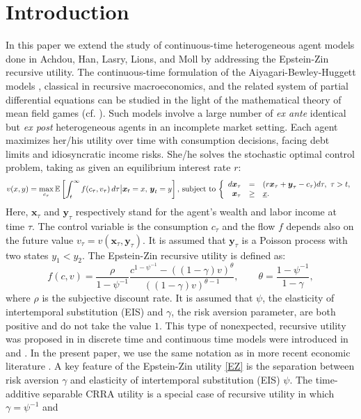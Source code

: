 \documentclass[11pt]{article}
\numberwithin{equation}{section}
\theoremstyle{definition}
\newcommand{\EE}{\mathbb{E}}
\newcommand{\g}{\gamma}
\newcommand{\p}{\psi}
\theoremstyle{plain}
\begin{document}
\section{Introduction}
	In this paper we extend the study of continuous-time heterogeneous agent models done in Achdou, Han, Lasry, Lions, and Moll \cite{achdou2022income} by addressing the {}{Epstein-Zin recursive utility}. The continuous-time formulation of the Aiyagari-Bewley-Huggett models \cite{huggett1993risk,aiyagari1994uninsured,ljungqvist2018recursive}, classical in recursive macroeconomics, and the related system of partial differential equations can be studied in the light of the mathematical theory of mean field games (cf. \cite{achdou2021mean,MR2295621}). Such models involve a large number of \textit{ex ante} identical but \textit{ex post} heterogeneous agents in an incomplete market setting. Each agent maximizes her/his utility over time with consumption decisions, facing debt limits and idiosyncratic income risks. She/he solves the stochastic optimal control problem, taking as given an equilibrium interest rate $r$:
	\begin{equation}\label{control_problem}
	v(x,y)=\max_{c_\tau}\EE \left[\int_t^{\infty} f(c_\tau,v_\tau)\, d\tau \big\vert \boldsymbol{x}_t=x,\,\boldsymbol{y}_t=y\right],\, \text{subject to}\,
      \left\{
        \begin{array}[c]{rcl}
          d\boldsymbol{x}_\tau &=& (r \boldsymbol{x}_\tau+\boldsymbol{y}_{\tau} - c_\tau)d\tau,\,\,\tau>t,\\
          \boldsymbol{x}_\tau  &\geq& \underline{x}.    
        \end{array}
      \right.  
	\end{equation}
	Here, $\boldsymbol{x}_\tau$ and $\boldsymbol{y}_{\tau}$ respectively stand for the agent's wealth and labor income at time $\tau$. The control variable is the consumption $c_\tau$ and the flow $f$ depends also on the future value $v_\tau=v(\boldsymbol{x}_\tau,\boldsymbol{y}_{\tau})$. It is assumed that $\boldsymbol{y}_{\tau}$ is a Poisson process with two states $y_1<y_2$. The Epstein-Zin recursive utility is defined as:
       \begin{equation}
         \label{EZ}
       f(c,v)=\frac{\rho}{1-\p^{-1}}\frac{c^{1-\p^{-1}}-((1-\g)v)^\theta}{((1-\g)v)^{\theta-1}},\qquad \theta=\frac{1-\p^{-1}}{1-\g},
       \end{equation}
where $\rho$ is the subjective discount rate. It is assumed that $\p$, the elasticity of intertemporal substitution (EIS) and $\g$, the risk aversion parameter, are both positive and do not take the value $1$. This type of nonexpected, recursive utility was proposed in \cite{EZ1989} in discrete time and continuous time models were introduced in \cite{duffie1992stochastic} and \cite{duffie1992pde}. In the present paper, we use the same notation as in more recent economic literature \cite{pindyck2013economic,wang2016optimal}. A key feature of the Epstein-Zin utility \eqref{EZ} is the separation between risk aversion $\gamma$ and elasticity of intertemporal substitution (EIS) $\psi$. The time-additive separable CRRA utility is a special case of recursive utility in which $\g=\psi^{-1}$ and 
\end{document}
